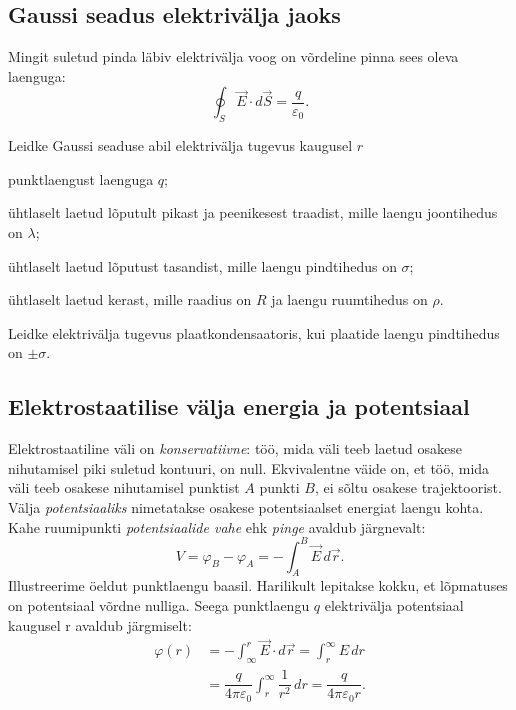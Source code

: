 \documentclass[a4paper,11pt,twocolumn]{article}
\begin{document}
\subsection{Gaussi seadus elektrivälja jaoks}
Mingit suletud pinda läbiv elektrivälja voog on võrdeline pinna sees oleva laenguga:
\begin{equation*}
    \oint_S\vec{E}\cdot d\vec{S}=\frac{q}{\varepsilon_0} \tag{I Maxwelli võrrand}.
\end{equation*}
\begin{question}
    Leidke Gaussi seaduse abil elektrivälja tugevus kaugusel $r$
    \begin{subquestion}
    \item punktlaengust laenguga \( q \);
    \item ühtlaselt laetud lõputult pikast ja peenikesest traadist, mille laengu joontihedus on $\lambda$;
    \item ühtlaselt laetud lõputust tasandist, mille laengu pindtihedus on $\sigma$;
    \item ühtlaselt laetud kerast, mille raadius on $R$ ja laengu ruumtihedus on $\rho$.
    \end{subquestion}
\end{question}

\begin{question}
    Leidke elektrivälja tugevus plaatkondensaatoris, kui plaatide laengu pindtihedus on $\pm\sigma$.
\end{question}

\subsection{Elektrostaatilise välja energia ja potentsiaal}
Elektrostaatiline väli on \textit{konservatiivne}: töö, mida väli teeb laetud osakese nihutamisel piki suletud kontuuri, on null. Ekvivalentne väide on, et töö, mida väli teeb osakese nihutamisel punktist \( A \) punkti \( B \), ei sõltu osakese trajektoorist. Välja \textit{potentsiaaliks} nimetatakse osakese potentsiaalset energiat laengu kohta. Kahe ruumipunkti \textit{potentsiaalide vahe} ehk \textit{pinge} avaldub järgnevalt:
\[ V=\varphi_B-\varphi_A=-\int_{A}^{B} \vec{E}\, d\vec{r}.\]
Illustreerime öeldut punktlaengu baasil. Harilikult lepitakse kokku, et lõpmatuses on potentsiaal võrdne nulliga. Seega punktlaengu \( q \) elektrivälja potentsiaal kaugusel r avaldub järgmiselt:
\begin{align*}
\varphi(r)&=-\int_{\infty}^{r}\vec{E}\cdot d\vec{r}=\int_{r}^{\infty}{E}\, dr\\
&=\dfrac{q}{4\pi\varepsilon_0}\int_{r}^{\infty}\dfrac{1}{r^2}\, dr=\dfrac{q}{4\pi\varepsilon_0 r}.
\end{align*}
\end{document}
